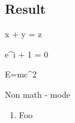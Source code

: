 \documentclass{article}
\begin{document}
	\subsection*{Result}
	\begin{mathlist}
		\item x + y = z
		\item e^{i\pi} + 1 = 0
		\item E=mc^2
		\item \)Non math - mode %
	\end{mathlist}
	\begin{enumerate}
		\item Foo %
	\end{enumerate}
\end{document}
